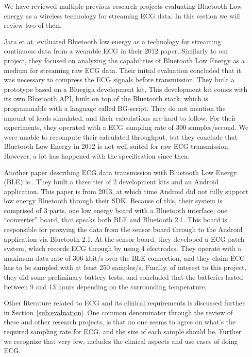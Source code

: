 We have reviewed multiple previous research projects evaluating Bluetooth Low energy as a wireless technology for streaming ECG data. In this section we will review two of them.

Jara et at. evaluated Bluetooth low energy as a technology for streaming continuous data from a wearable ECG in their 2012 paper. Similarly to our project, they focused on analyzing the capabilities of Bluetooth Low Energy as a medium for streaming raw ECG data. Their initial evaluation concluded that it was necessary to compress the ECG signals before transmission. They built a prototype based on a Bluegiga development kit. This development kit comes with its own Bluetooth API, built on top of the Bluetooth stack, which is programmable with a language called BG-script. They do not mention the amount of leads simulated, and their calculations are hard to follow. For their experiments, they operated with a ECG sampling rate of 300 samples/second. We were unable to recompute their calculated throughput, but they conclude that Bluetooth Low Energy in 2012 is not well suited for raw ECG transmission. However, a lot has happened with the specification since then.

Another paper describing ECG data transmission with Bluetooth Low Energy (BLE) is \cite{Anonymous:1SQ78ejy}. They built a three tier of 2 development kits and an Android application. This paper is from 2013, at which time Android did not fully support low energy Bluetooth through their SDK. Because of this, their system is comprised of 3 parts, one low energy board with a Bluetooth interface, one ``converter'' board, that speaks both BLE and Bluetooth 2.1. This board is responsible for proxying the data from the sensor board through to the Android application via Bluetooth 2.1. At the sensor board, they developed a ECG patch system, which records ECG through by using 4 electrodes. They operate with a maximum data rate of 306 kbit/s over the BLE connection, and they claim ECG has to be sampled with at least 250 samples/s. Finally, of interest to this project, they did some preliminary battery tests, and concluded that the batteries lasted between 9 and 13 hours depending on the surrounding temperature.

Other literature related to ECG and its clinical requirements is discussed further in Section~\ref{sub:evaluation}. One common denominator through the review of these and other research projects, is that no one seems to agree on what's the required sampling rate for ECG, and the size of each sample should be. Further we recognize that very few, includes the clinical aspects and use cases of doing ECG.

